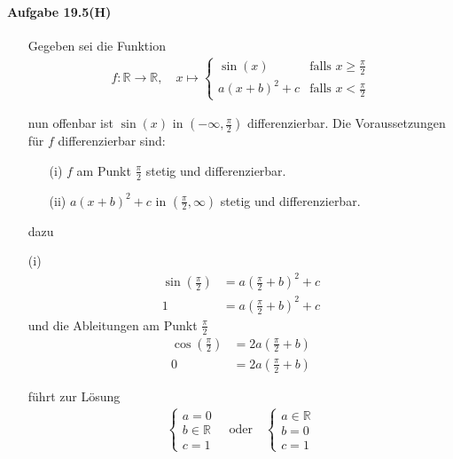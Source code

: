 \documentclass[11pt,a4paper]{article}
\begin{document}
\paragraph{Aufgabe 19.5(H)}

\begin{enumerate}

\item[]

Gegeben sei die Funktion
\begin{align*}
f:\mathbb{R}\rightarrow\mathbb{R},
\hspace{1em}
x\mapsto
\left\{
\begin{array}{lcl}
\sin(x) & \mbox{falls }x\geq\frac{\pi}{2} \\
a(x+b)^2+c & \mbox{falls }x<\frac{\pi}{2}
\end{array}
\right.
\end{align*}

nun offenbar ist $\sin(x)$ in $(-\infty,\frac{\pi}{2})$ differenzierbar. Die Voraussetzungen für $f$ differenzierbar sind:
\begin{enumerate}
\item[(i)]$f$ am Punkt $\frac{\pi}{2}$ stetig und differenzierbar.
\item[(ii)]$a(x+b)^2+c$ in $(\frac{\pi}{2},\infty)$ stetig und differenzierbar.
\end{enumerate}

dazu
\item[(i)]
\begin{align*}
\sin(\frac{\pi}{2})&=a(\frac{\pi}{2}+b)^2+c \\
1&=a(\frac{\pi}{2}+b)^2+c
\end{align*}
und die Ableitungen am Punkt $\frac{\pi}{2}$
\begin{align*}
\cos(\frac{\pi}{2})&=2a(\frac{\pi}{2}+b) \\
0&=2a(\frac{\pi}{2}+b)
\end{align*}

führt zur Lösung
\begin{align*}
\left\{
\begin{array}{lcl}
a=0 \\
b\in\mathbb{R} \\
c=1
\end{array}
\right.
\hspace{1em}\mbox{oder}\hspace{1em}
\left\{
\begin{array}{lcl}
a\in\mathbb{R} \\
b=0 \\
c=1
\end{array}
\right.
\end{align*}


\end{enumerate}
\end{document}
